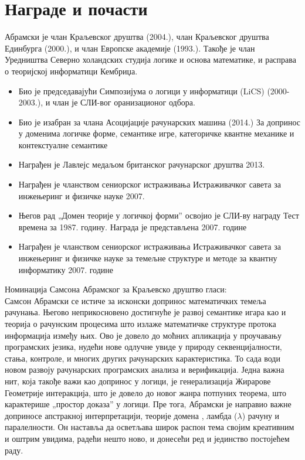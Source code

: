 \documentclass[a4paper]{article}
\begin{document}
\section{Награде и почасти}
Абрамски је члан Краљевског друштва (2004.), члан Краљевског друштва Единбурга (2000.),\cite{saf} и члан Европске академије (1993.). Такође је члан Уредништва Северно холандских студија логике и основа математике, и расправа о теоријској информатици Кембриџа. 
\begin{itemize}
\item    Био је председавајући Симпозијума о логици у информатици (LiCS) (2000- 2003.), и члан је СЛИ-вог оранизационог одбора.

\item    Био је изабран за члана Асоцијације рачунарских машина (2014.) За допринос у доменима логичке форме, семантике игре, категоричке квантне механике и контекстуалне семантике
\item    Награђен је Лавлејс медаљом британског рачунарског друштва 2013.\cite{sat}
\item    Награђен је чланством сениорског истраживања Истраживачког савета за инжењеринг и физичке науке 2007.
\item    Његов рад „Домен теорије у логичкој форми” освојио је СЛИ-ву награду Тест времена за 1987. годину. Награда је представљена 2007. године
\item    Награђен је чланством сениорског истраживања Истраживачког савета за инжењеринг и физичке науке за темељне структуре и методе за квантну информатику 2007. године
\end{itemize}
Номинација Самсона Абрамског за Краљевско друштво гласи:\\

Самсон Абрамски се истиче за исконски допринос математичких темеља рачунања. Његово неприкосновено достигнуће је развој семантике игара као и теорија о рачунским процесима што излаже математичке структуре протока информација између њих. Ово је довело до моћних апликација у проучавању програмских језика, нудећи нове одлучне увиде у природу секвенцијалности, стања, контроле, и многих других рачунарских карактеристика. То сада води новом развоју рачунарских програмских анализа и верификација. Једна важна нит, која такође важи као допринос у логици, је генерализација Жирарове Геометрије интеракција, што је довело до новог жанра потпуних теорема, што карактерише „простор доказа” у логици. Пре тога, Абрамски је направио важне доприносе апстракној интерпретацији, теорије домена , ламбда ($\lambda$) рачуну и паралелности. Он наставља да осветљава широк распон тема својим креативним и оштрим увидима, радећи нешто ново, и донесећи ред и јединство постојећем раду.
\end{document}
